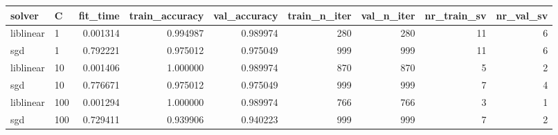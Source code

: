 \begin{tabular}{llrrrrrrr}
\toprule
   solver &   C &  fit\_time &  train\_accuracy &  val\_accuracy &  train\_n\_iter &  val\_n\_iter &  nr\_train\_sv &  nr\_val\_sv \\
\midrule
liblinear &   1 &  0.001314 &        0.994987 &      0.989974 &           280 &         280 &           11 &          6 \\
      sgd &   1 &  0.792221 &        0.975012 &      0.975049 &           999 &         999 &           11 &          6 \\
liblinear &  10 &  0.001406 &        1.000000 &      0.989974 &           870 &         870 &            5 &          2 \\
      sgd &  10 &  0.776671 &        0.975012 &      0.975049 &           999 &         999 &            7 &          4 \\
liblinear & 100 &  0.001294 &        1.000000 &      0.989974 &           766 &         766 &            3 &          1 \\
      sgd & 100 &  0.729411 &        0.939906 &      0.940223 &           999 &         999 &            7 &          2 \\
\bottomrule
\end{tabular}
